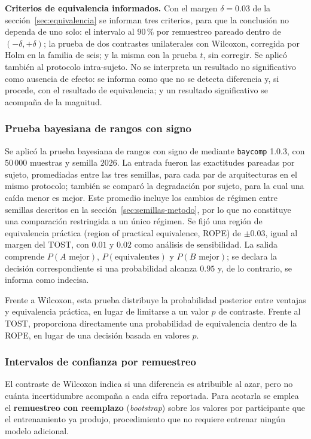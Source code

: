 \textbf{Criterios de equivalencia informados.} Con el margen $\delta = 0.03$ de la
sección~\ref{sec:equivalencia} se informan tres criterios, para que la conclusión no
dependa de uno solo: el intervalo al $90$\,\% por remuestreo pareado dentro de
$(-\delta, +\delta)$; la prueba de dos contrastes unilaterales con Wilcoxon, corregida por
Holm en la familia de seis; y la misma con la prueba $t$, sin corregir. Se aplicó también al
protocolo intra-sujeto. No se interpreta un resultado no significativo como ausencia de
efecto: se informa como que no se detecta diferencia y, si procede, con el resultado de
equivalencia; y un resultado significativo se acompaña de la magnitud.


\subsubsection{Prueba bayesiana de rangos con signo}

Se aplicó la prueba bayesiana de rangos con signo de \cite{benavoli2017} mediante \texttt{baycomp} 1.0.3, con $50\,000$ muestras y semilla $2026$. La entrada fueron las exactitudes pareadas por sujeto, promediadas entre las tres semillas, para cada par de arquitecturas en el mismo protocolo; también se comparó la degradación por sujeto, para la cual una caída menor es mejor. Este promedio incluye los cambios de régimen entre semillas descritos en la sección~\ref{sec:semillas-metodo}, por lo que no constituye una comparación restringida a un único régimen. Se fijó una región de equivalencia práctica (region of practical equivalence, ROPE) de $\pm 0.03$, igual al margen del TOST, con $0.01$ y $0.02$ como análisis de sensibilidad. La salida comprende $P(A\text{ mejor})$, $P(\text{equivalentes})$ y $P(B\text{ mejor})$; se declara la decisión correspondiente si una probabilidad alcanza $0.95$ y, de lo contrario, se informa como indecisa.

Frente a Wilcoxon, esta prueba distribuye la probabilidad posterior entre ventajas y equivalencia práctica, en lugar de limitarse a un valor $p$ de contraste. Frente al TOST, proporciona directamente una probabilidad de equivalencia dentro de la ROPE, en lugar de una decisión basada en valores $p$.

\subsubsection{Intervalos de confianza por remuestreo}
\label{sec:bootstrap}

El contraste de Wilcoxon indica si una diferencia es atribuible al azar, pero no cuánta
incertidumbre acompaña a cada cifra reportada. Para acotarla se emplea el
\textbf{remuestreo con reemplazo} (\textit{bootstrap}) \cite{efron1979} sobre los valores por participante
que el entrenamiento ya produjo, procedimiento que no requiere entrenar ningún modelo
adicional.

